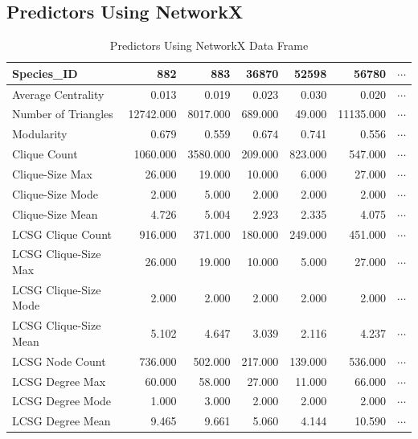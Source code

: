 \documentclass[12pt]{article}
\begin{document}
\subsection{Predictors Using NetworkX}
\begin{table}[H]
\centering
\caption{Predictors Using NetworkX Data Frame}
\begin{tabular}{lrrrrrr}
\toprule
Species\_ID &      882   &     883   &    36870 &    52598 &      56780 & $\cdots$ \\
\midrule
Average Centrality    &      0.013 &     0.019 &    0.023 &    0.030 &      0.020 & $\cdots$ \\
Number of Triangles   &  12742.000 &  8017.000 &  689.000 &   49.000 &  11135.000 & $\cdots$\\
Modularity            &      0.679 &     0.559 &    0.674 &    0.741 &      0.556 & $\cdots$\\
Clique Count          &   1060.000 &  3580.000 &  209.000 &  823.000 &    547.000 & $\cdots$\\
Clique-Size Max       &     26.000 &    19.000 &   10.000 &    6.000 &     27.000 & $\cdots$\\
Clique-Size Mode      &      2.000 &     5.000 &    2.000 &    2.000 &      2.000 & $\cdots$\\
Clique-Size Mean      &      4.726 &     5.004 &    2.923 &    2.335 &      4.075 & $\cdots$\\
LCSG Clique Count     &    916.000 &   371.000 &  180.000 &  249.000 &    451.000 & $\cdots$\\
LCSG Clique-Size Max  &     26.000 &    19.000 &   10.000 &    5.000 &     27.000 & $\cdots$\\
LCSG Clique-Size Mode &      2.000 &     2.000 &    2.000 &    2.000 &      2.000 & $\cdots$\\
LCSG Clique-Size Mean &      5.102 &     4.647 &    3.039 &    2.116 &      4.237 & $\cdots$\\
LCSG Node Count       &    736.000 &   502.000 &  217.000 &  139.000 &    536.000 & $\cdots$\\
LCSG Degree Max       &     60.000 &    58.000 &   27.000 &   11.000 &     66.000 & $\cdots$\\
LCSG Degree Mode      &      1.000 &     3.000 &    2.000 &    2.000 &      2.000 & $\cdots$\\
LCSG Degree Mean      &      9.465 &     9.661 &    5.060 &    4.144 &     10.590 & $\cdots$\\
\bottomrule
\end{tabular}
\end{table}
\end{document}
